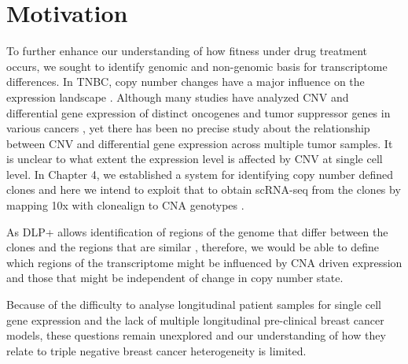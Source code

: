 






 
 
 
 
 
 
 
 
 
 
 
 
 
 
 
 
 \section{Motivation}


To further enhance our understanding of how fitness under drug treatment occurs, we sought to identify genomic and non-genomic basis for transcriptome differences. 
In TNBC, copy number changes have a major influence on the expression landscape \cite{wang2016integrative}.
Although many studies have analyzed CNV and differential gene expression of distinct oncogenes and tumor suppressor genes in various cancers \cite{kuzyk2015mycn, budczies2016pan, kwak2015fibroblast}, yet there has been no precise study about the relationship between CNV and differential gene expression across multiple tumor samples. It is unclear to what extent the expression level is affected by CNV at single cell level.
In Chapter 4, we established a system for identifying copy number defined clones and here we intend to exploit that to obtain scRNA-seq from the clones by mapping 10x with clonealign to CNA genotypes \cite{campbell2019clonealign}.

As \ac{DLP+} allows identification of regions of the genome that differ between the clones and the regions that are similar \cite{laks2019clonal}, therefore, we would be able to define which regions of the transcriptome might be influenced by CNA driven expression and those that might be independent of change in copy number state.

Because of the difficulty to analyse longitudinal patient samples for single cell gene expression and the lack of multiple longitudinal pre-clinical breast cancer models, these questions remain unexplored and our understanding of how they relate to triple negative breast cancer heterogeneity is limited.

